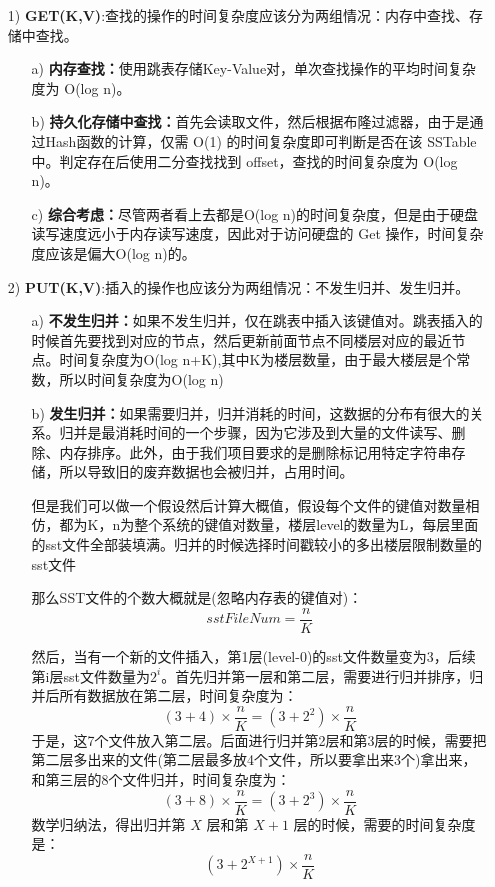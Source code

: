 \documentclass[fontset=windows]{article}
\begin{document}
\begin{itemize}
    \item [1)] \textbf{GET(K,V)}:查找的操作的时间复杂度应该分为两组情况：内存中查找、存储中查找。
    \begin{itemize}
    \item [a)] \textbf{内存查找：}使用跳表存储Key-Value对，单次查找操作的平均时间复杂度为 O(log n)。
    \item [b)] \textbf{持久化存储中查找：}首先会读取文件，然后根据布隆过滤器，由于是通过Hash函数的计算，仅需 O(1) 的时间复杂度即可判断是否在该 SSTable 中。判定存在后使用二分查找找到 offset，查找的时间复杂度为 O(log n)。
    
    \item [c)] \textbf{综合考虑：}尽管两者看上去都是O(log n)的时间复杂度，但是由于硬盘读写速度远小于内存读写速度，因此对于访问硬盘的 Get 操作，时间复杂度应该是偏大O(log n)的。
    \end{itemize}
    
    \item [2)] \textbf{PUT(K,V)}:插入的操作也应该分为两组情况：不发生归并、发生归并。
    \begin{itemize}
    \item [a)] \textbf{不发生归并：}如果不发生归并，仅在跳表中插入该键值对。跳表插入的时候首先要找到对应的节点，然后更新前面节点不同楼层对应的最近节点。时间复杂度为O(log n+K),其中K为楼层数量，由于最大楼层是个常数，所以时间复杂度为O(log n)
    
    \item [b)] \textbf{发生归并：}如果需要归并，归并消耗的时间，这数据的分布有很大的关系。归并是最消耗时间的一个步骤，因为它涉及到大量的文件读写、删除、内存排序。此外，由于我们项目要求的是删除标记用特定字符串存储，所以导致旧的废弃数据也会被归并，占用时间。
    
    但是我们可以做一个假设然后计算大概值，假设每个文件的键值对数量相仿，都为K，n为整个系统的键值对数量，楼层level的数量为L，每层里面的sst文件全部装填满。归并的时候选择时间戳较小的多出楼层限制数量的sst文件
    
    那么SST文件的个数大概就是(忽略内存表的键值对)：
    $$sstFileNum = \frac{n}{K} $$
    
    然后，当有一个新的文件插入，第1层(level-0)的sst文件数量变为3，后续第i层sst文件数量为$2^i$。首先归并第一层和第二层，需要进行归并排序，归并后所有数据放在第二层，时间复杂度为：
    $$(3 + 4) \times \frac{n}{K} = (3 + 2^2)\times \frac{n}{K} $$
    于是，这7个文件放入第二层。后面进行归并第2层和第3层的时候，需要把第二层多出来的文件(第二层最多放4个文件，所以要拿出来3个)拿出来，和第三层的8个文件归并，时间复杂度为：
    $$(3 + 8) \times \frac{n}{K} = (3 + 2^3)\times \frac{n}{K} $$
    数学归纳法，得出归并第 $X$ 层和第 $X + 1$ 层的时候，需要的时间复杂度是：
    $$(3 + 2^{X+1}) \times \frac{n}{K} $$
    

\end{itemize}
\end{itemize}
\end{document}
